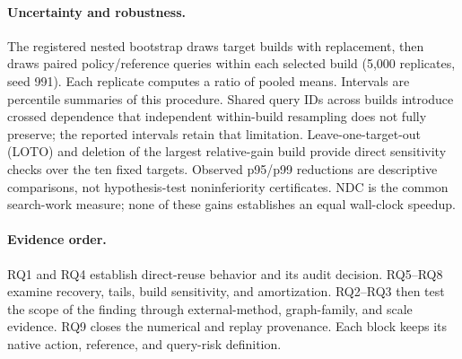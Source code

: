 \paragraph{Uncertainty and robustness.}
The registered nested bootstrap draws target builds with replacement, then draws paired policy/reference queries within each selected build (5,000 replicates, seed 991). Each replicate computes a ratio of pooled means. Intervals are percentile summaries of this procedure. Shared query IDs across builds introduce crossed dependence that independent within-build resampling does not fully preserve; the reported intervals retain that limitation. Leave-one-target-out (LOTO) and deletion of the largest relative-gain build provide direct sensitivity checks over the ten fixed targets. Observed p95/p99 reductions are descriptive comparisons, not hypothesis-test noninferiority certificates. NDC is the common search-work measure; none of these gains establishes an equal wall-clock speedup.

\paragraph{Evidence order.}
RQ1 and RQ4 establish direct-reuse behavior and its audit decision. RQ5--RQ8 examine recovery, tails, build sensitivity, and amortization. RQ2--RQ3 then test the scope of the finding through external-method, graph-family, and scale evidence. RQ9 closes the numerical and replay provenance. Each block keeps its native action, reference, and query-risk definition.
